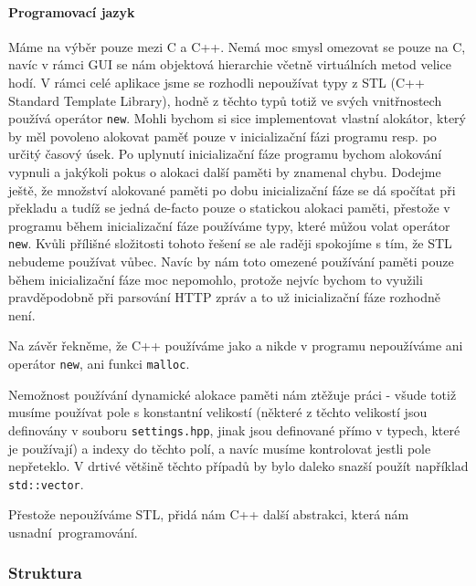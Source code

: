 \paragraph{Programovací jazyk}
Máme na výběr pouze mezi C a C++.
Nemá moc smysl omezovat se pouze na C, navíc v rámci GUI se nám objektová hierarchie včetně
virtuálních metod velice hodí.
V rámci celé aplikace jsme se rozhodli nepoužívat typy z STL (C++ Standard Template Library), hodně z
těchto typů totiž ve svých vnitřnostech používá operátor \texttt{new}.
Mohli bychom si sice implementovat vlastní alokátor, který by měl povoleno alokovat paměť pouze
v inicializační fázi programu resp. po určitý časový úsek.
Po uplynutí inicializační fáze programu bychom alokování vypnuli a jakýkoli pokus o alokaci další
paměti by znamenal chybu.
Dodejme ještě, že množství alokované paměti po dobu inicializační fáze se dá spočítat při překladu
a tudíž se jedná de-facto pouze o statickou alokaci paměti, přestože v programu během inicializační
fáze používáme typy, které můžou volat operátor \texttt{new}.
Kvůli přílišné složitosti tohoto řešení se ale raději spokojíme s tím, že STL nebudeme používat vůbec.
Navíc by nám toto omezené používání  paměti pouze během inicializační fáze
moc nepomohlo, protože nejvíc bychom to využili pravděpodobně při parsování HTTP zpráv a to už
inicializační fáze rozhodně není.

Na závěr řekněme, že C++ používáme jako  a nikde v programu nepoužíváme ani operátor
\texttt{new}, ani funkci \texttt{malloc}.

Nemožnost používání dynamické alokace paměti nám ztěžuje práci - všude totiž musíme používat pole s
konstantní velikostí (některé z těchto velikostí jsou definovány v souboru \texttt{settings.hpp}, jinak
jsou definované přímo v typech, které je používají) a indexy do těchto polí, a navíc musíme kontrolovat
jestli pole nepřeteklo.
V drtivé většině těchto případů by bylo daleko snazší použít například \texttt{std::vector}.

Přestože nepoužíváme STL, přidá nám C++ další abstrakci, která nám usnadní~programování.

\subsubsection{Struktura}


